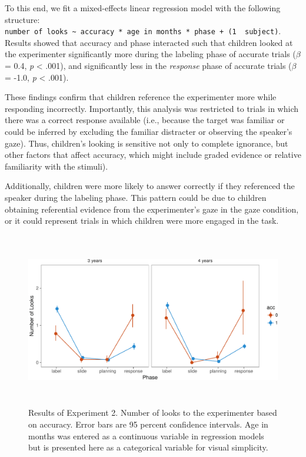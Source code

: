 \documentclass[a4paper,man,apacite,floatsintext]{apa6}
\newenvironment{CodeChunk}{}{}
\begin{document}
To this end, we fit a mixed-effects linear regression model with the
following structure:
\texttt{number\ of\ looks\ \textasciitilde{}\ accuracy\ *\ age\ in\ months\ *\ phase\ +\ (1\ \textbar{}\ subject)}.
Results showed that accuracy and phase interacted such that children
looked at the experimenter significantly more during the labeling phase
of accurate trials (\(\beta\) = 0.4, \emph{p} \textless{} .001), and
significantly less in the \emph{response} phase of accurate trials
(\(\beta\) = -1.0, \emph{p} \textless{} .001).

These findings confirm that children reference the experimenter more
while responding incorrectly. Importantly, this analysis was restricted
to trials in which there was a correct response available (i.e., because
the target was familiar or could be inferred by excluding the familiar
distracter or observing the speaker's gaze). Thus, children's looking is
sensitive not only to complete ignorance, but other factors that affect
accuracy, which might include graded evidence or relative familiarity
with the stimuli).

Additionally, children were more likely to answer correctly if they
referenced the speaker during the labeling phase. This pattern could be
due to children obtaining referential evidence from the experimenter's
gaze in the gaze condition, or it could represent trials in which
children were more engaged in the task.

\begin{CodeChunk}
\begin{figure}[b]

{\centering \includegraphics[width=6in,height=3in]{figs/acc_results_e2-1} 

}

\caption[Results of Experiment 2]{Results of Experiment 2. Number of looks to the experimenter based on accuracy. Error bars are 95 percent confidence intervals. Age in months was entered as a continuous variable in regression models but is presented here as a categorical variable for visual simplicity.}\label{fig:acc_results_e2}
\end{figure}
\end{CodeChunk}
\end{document}
